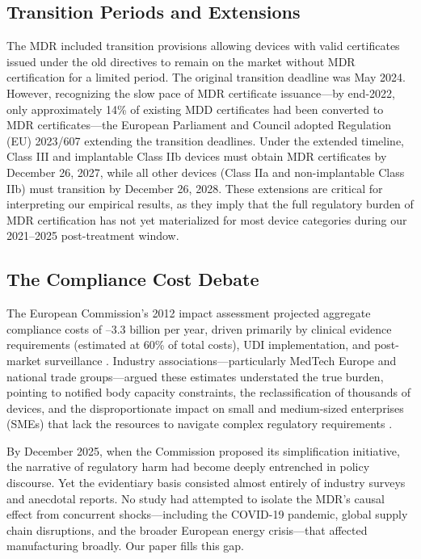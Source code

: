 \documentclass[12pt]{article}
\begin{document}
\subsection{Transition Periods and Extensions}

The MDR included transition provisions allowing devices with valid certificates issued under the old directives to remain on the market without MDR certification for a limited period. The original transition deadline was May 2024. However, recognizing the slow pace of MDR certificate issuance---by end-2022, only approximately 14\% of existing MDD certificates had been converted to MDR certificates---the European Parliament and Council adopted Regulation (EU) 2023/607 extending the transition deadlines. Under the extended timeline, Class III and implantable Class IIb devices must obtain MDR certificates by December 26, 2027, while all other devices (Class IIa and non-implantable Class IIb) must transition by December 26, 2028. These extensions are critical for interpreting our empirical results, as they imply that the full regulatory burden of MDR certification has not yet materialized for most device categories during our 2021--2025 post-treatment window.

\subsection{The Compliance Cost Debate}

The European Commission's 2012 impact assessment projected aggregate compliance costs of --3.3 billion per year, driven primarily by clinical evidence requirements (estimated at 60\% of total costs), UDI implementation, and post-market surveillance \citep{europeancommission2012meddev}. Industry associations---particularly MedTech Europe and national trade groups---argued these estimates understated the true burden, pointing to notified body capacity constraints, the reclassification of thousands of devices, and the disproportionate impact on small and medium-sized enterprises (SMEs) that lack the resources to navigate complex regulatory requirements \citep{medtecheurope2023industry}.

By December 2025, when the Commission proposed its simplification initiative, the narrative of regulatory harm had become deeply entrenched in policy discourse. Yet the evidentiary basis consisted almost entirely of industry surveys and anecdotal reports. No study had attempted to isolate the MDR's causal effect from concurrent shocks---including the COVID-19 pandemic, global supply chain disruptions, and the broader European energy crisis---that affected manufacturing broadly. Our paper fills this gap.
\end{document}
